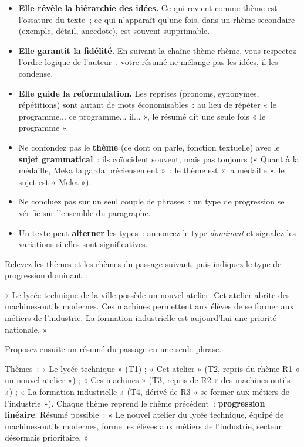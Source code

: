 \documentclass[11pt]{article}
\begin{document}
\begin{itemize}
\item \textbf{Elle révèle la hiérarchie des idées.} Ce qui revient comme thème est l'ossature du texte~; ce qui n'apparaît qu'une fois, dans un rhème secondaire (exemple, détail, anecdote), est souvent supprimable.
\item \textbf{Elle garantit la fidélité.} En suivant la chaîne thème-rhème, vous respectez l'ordre logique de l'auteur~: votre résumé ne mélange pas les idées, il les condense.
\item \textbf{Elle guide la reformulation.} Les reprises (pronoms, synonymes, répétitions) sont autant de mots économisables~: au lieu de répéter « le programme... ce programme... il... », le résumé dit une seule fois « le programme ».
\end{itemize}

\begin{attention}
\begin{itemize}
\item Ne confondez pas le \textbf{thème} (ce dont on parle, fonction textuelle) avec le \textbf{sujet grammatical}~: ils coïncident souvent, mais pas toujours (« Quant à la médaille, Meka la garda précieusement »~: le thème est « la médaille », le sujet est « Meka »).
\item Ne concluez pas sur un seul couple de phrases~: un type de progression se vérifie sur l'ensemble du paragraphe.
\item Un texte peut \textbf{alterner} les types~: annoncez le type \emph{dominant} et signalez les variations si elles sont significatives.
\end{itemize}
\end{attention}

\begin{exercice}
Relevez les thèmes et les rhèmes du passage suivant, puis indiquez le type de progression dominant~:

« Le lycée technique de la ville possède un nouvel atelier. Cet atelier abrite des machines-outils modernes. Ces machines permettent aux élèves de se former aux métiers de l'industrie. La formation industrielle est aujourd'hui une priorité nationale. »

Proposez ensuite un résumé du passage en une seule phrase.
\end{exercice}

\begin{corrige}[Exercice 1]
Thèmes~: « Le lycée technique » (T1) ; « Cet atelier » (T2, repris du rhème R1 « un nouvel atelier ») ; « Ces machines » (T3, repris de R2 « des machines-outils ») ; « La formation industrielle » (T4, dérivé de R3 « se former aux métiers de l'industrie »). Chaque thème reprend le rhème précédent~: \textbf{progression linéaire}. Résumé possible~: « Le nouvel atelier du lycée technique, équipé de machines-outils modernes, forme les élèves aux métiers de l'industrie, secteur désormais prioritaire. »
\end{corrige}
\end{document}
